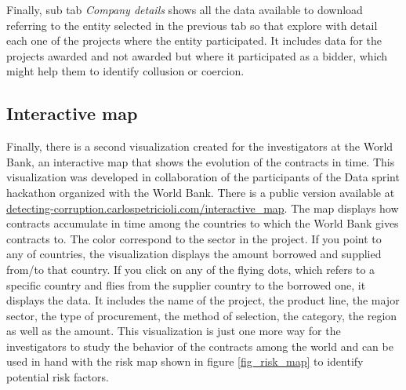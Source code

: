 Finally, sub tab \textit{Company details} shows all the data available to download referring to the entity selected in the previous tab so that explore with detail each one of the projects where the entity participated. It includes data for the projects awarded and not awarded but where it participated as a bidder, which might help them to identify collusion or coercion.

\subsection{Interactive map}

Finally, there is a second visualization created for the investigators at the World Bank, an interactive map that shows the evolution of the contracts in time. This visualization was developed in collaboration of the participants of the Data sprint hackathon organized with the World Bank. There is a public version available at \href{http://detecting-corruption.carlospetricioli.com/interactive_map}{detecting-corruption.carlospetricioli.com/interactive\_map}. The map displays how contracts accumulate in time among the countries to which the World Bank gives contracts to. The color correspond to the sector in the project. If you point to any of countries, the visualization displays the amount borrowed and supplied from/to that country. If you click on any of the flying dots, which refers to a specific country and flies from the supplier country to the borrowed one, it displays the data. It includes the name of the project, the product line, the major sector, the type of procurement, the method of selection, the category, the region as well as the amount. This visualization is just one more way for the investigators to study the behavior of the contracts among the world and can be used in hand with the risk map shown in figure \ref{fig_risk_map} to identify potential risk factors.


